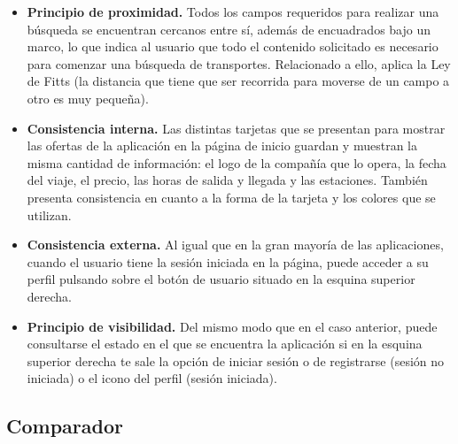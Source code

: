\begin{itemize}
    \item \textbf{Principio de proximidad.} Todos los campos requeridos para realizar una búsqueda se encuentran
        cercanos entre sí, además de encuadrados bajo un marco, lo que indica al usuario que todo el contenido
        solicitado es necesario para comenzar una búsqueda de transportes. Relacionado a ello, aplica la Ley de
        Fitts (la distancia que tiene que ser recorrida para moverse de un campo a otro es muy pequeña).
    \item \textbf{Consistencia interna.} Las distintas tarjetas que se presentan para mostrar las ofertas de la
        aplicación en la página de inicio guardan y muestran la misma cantidad de información: el logo de la compañía
        que lo opera, la fecha del viaje, el precio, las horas de salida y llegada y las estaciones. También presenta
        consistencia en cuanto a la forma de la tarjeta y los colores que se utilizan.
    \item \textbf{Consistencia externa.} Al igual que en la gran mayoría de las aplicaciones, cuando el usuario tiene la sesión
        iniciada en la página, puede acceder a su perfil pulsando sobre el botón de usuario situado en la esquina
        superior derecha.
    \item \textbf{Principio de visibilidad.} Del mismo modo que en el caso anterior, puede consultarse el estado en el que
        se encuentra la aplicación si en la esquina superior derecha te sale la opción de iniciar sesión o de
        registrarse (sesión no iniciada) o el icono del perfil (sesión iniciada).
\end{itemize}

\subsection*{Comparador}

